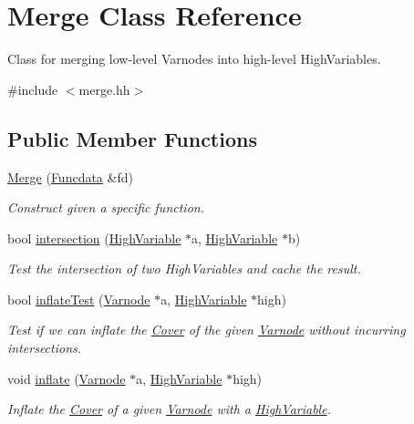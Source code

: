 \hypertarget{class_merge}{}\section{Merge Class Reference}
\label{class_merge}


Class for merging low-\/level Varnodes into high-\/level High\+Variables.  




{\ttfamily \#include $<$merge.\+hh$>$}

\subsection*{Public Member Functions}
\begin{DoxyCompactItemize}
\item 
\mbox{\hyperlink{class_merge_ad96bd04ca6c3bd22347ef0cf01f027c2}{Merge}} (\mbox{\hyperlink{class_funcdata}{Funcdata}} \&fd)
\begin{DoxyCompactList}\small\item\em Construct given a specific function. \end{DoxyCompactList}\item 
bool \mbox{\hyperlink{class_merge_abc0c74b3892b9724fd4091a126631089}{intersection}} (\mbox{\hyperlink{class_high_variable}{High\+Variable}} $\ast$a, \mbox{\hyperlink{class_high_variable}{High\+Variable}} $\ast$b)
\begin{DoxyCompactList}\small\item\em Test the intersection of two High\+Variables and cache the result. \end{DoxyCompactList}\item 
bool \mbox{\hyperlink{class_merge_a682cf4cedcb80161fa47a1f0c7382a77}{inflate\+Test}} (\mbox{\hyperlink{class_varnode}{Varnode}} $\ast$a, \mbox{\hyperlink{class_high_variable}{High\+Variable}} $\ast$high)
\begin{DoxyCompactList}\small\item\em Test if we can inflate the \mbox{\hyperlink{class_cover}{Cover}} of the given \mbox{\hyperlink{class_varnode}{Varnode}} without incurring intersections. \end{DoxyCompactList}\item 
void \mbox{\hyperlink{class_merge_a157b6a6d44e6aec22f1bb77201f3e402}{inflate}} (\mbox{\hyperlink{class_varnode}{Varnode}} $\ast$a, \mbox{\hyperlink{class_high_variable}{High\+Variable}} $\ast$high)
\begin{DoxyCompactList}\small\item\em Inflate the \mbox{\hyperlink{class_cover}{Cover}} of a given \mbox{\hyperlink{class_varnode}{Varnode}} with a \mbox{\hyperlink{class_high_variable}{High\+Variable}}. \end{DoxyCompactList}\item 

\end{DoxyCompactItemize}

